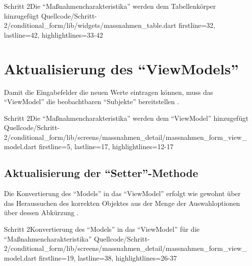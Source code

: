 \begin{alexlisting}{Schritt 2}{Die \enquote{Maßnahmencharakteristika} werden dem Tabellenkörper hinzugefügt}
  {Quellcode/Schritt-2/conditional_form/lib/widgets/massnahmen_table.dart}
  {firstline=32, lastline=42, highlightlines={33-42}}
  \label{lst:Schritt2MassnahmencharakteristikaWerdenDemTabellenkoerperHinzugefuegt}
\end{alexlisting}


\clearpage
\section{Aktualisierung des \enquote{ViewModels}}

Damit die Eingabefelder die neuen Werte eintragen können,
muss das \enquote{ViewModel} die beobachtbaren \enquote{Subjekte} bereitstellen .

\begin{alexlisting}{Schritt 2}{Die \enquote{Maßnahmencharakteristika} werden dem \enquote{ViewModel} hinzugefügt}
  {Quellcode/Schritt-2/conditional_form/lib/screens/massnahmen_detail/massnahmen_form_view_model.dart}
  {firstline=5, lastline=17, highlightlines={12-17}}
  \label{lst:Schritt2MassnahmencharakteristikaWerdenDemViewModelHinzugefuegt}
\end{alexlisting}

\subsection{Aktualisierung der \enquote{Setter}-Methode}

Die Konvertierung des \enquote{Models} in das \enquote{ViewModel} erfolgt wie gewohnt
über das Heraussuchen des korrekten Objektes aus der Menge der Auswahloptionen
über dessen Abkürzung . 

\begin{alexlisting}{Schritt 2}{Konvertierung des \enquote{Models} in das \enquote{ViewModel} für die \enquote{Maßnahmencharakteristika}}
  {Quellcode/Schritt-2/conditional_form/lib/screens/massnahmen_detail/massnahmen_form_view_model.dart}
  {firstline=19, lastline=38, highlightlines={26-37}}
  \label{lst:Schritt2KonvertierungDesModelsInDasViewModel}
\end{alexlisting}

